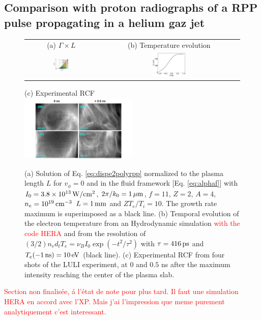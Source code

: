 \documentclass[
 reprint,
 amsmath,amssymb,
 aps,
]{revtex4-1}
\begin{document}
\subsection{Comparison with proton radiographs of a RPP pulse propagating in a helium gaz jet}
\begin{figure}
\begin{tabular}{cc}
(a) $\Gamma \times L$ &
(b) Temperature evolution \\
\includegraphics[width=0.24\textwidth]{XpFuchs.png}& 
\includegraphics[width=0.24\textwidth]{XpFuchs_te.eps}
\end{tabular}
(c) Experimental RCF \\
\includegraphics[width=0.5\textwidth]{rcf.png}
\caption{ \label{fig:xpfuchs}  
(a) Solution of Eq. \eqref{eq:dispe2polyrpp} normalized to the plasma length  $L$  for $v_\phi=0$ and in the fluid framework [Eq. \eqref{eq:alphaf}] with $I_0=3.8\times 10^{13}\, \rm W/cm^2$, $2\pi/k_0=1\,\rm\mu m$, $f=11$, $Z=2$, $A=4$, $n_e=10^{19} \,\rm cm^{-3}$  $L=1\,\rm mm$ and  $ZT_e/T_i=10$. 
The growth rate maximum is superimposed as a  black line.
(b) Temporal evolution of the electron temperature from an Hydrodynamic simulation  \textcolor{red}{with the code HERA} and from the resolution of $(3/2)n_e d_tT_e=\nu_BI_0\exp(-t^2/\tau^2)$ with $\tau = 416\,\rm ps$  and $T_e(-1 \, \rm{ns})=10\,\rm eV$ (black line).
(c) Experimental RCF from four shots of the LULI experiment, at $0$ and $0.5$ ns after the maximum intensity reaching the center of the plasma slab. 
 }
\end{figure}
\textcolor{red}{Section non finalis\'ee, \'a l'\'etat de note pour plus tard. Il faut une simulation HERA en accord avec l'XP. Mais j'ai l'impression que meme purement analytiquement c'est interessant.}
\end{document}
